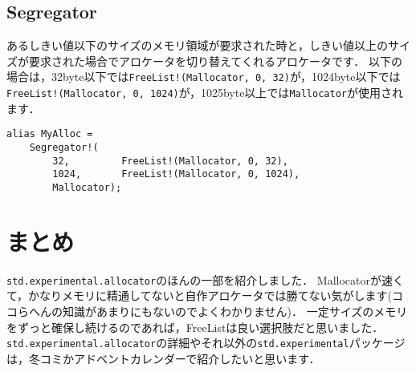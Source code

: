 \subsection{Segregator}

あるしきい値以下のサイズのメモリ領域が要求された時と，しきい値以上のサイズが要求された場合でアロケータを切り替えてくれるアロケータです．
以下の場合は，32byte以下では\texttt{FreeList!(Mallocator,\ 0,\ 32)}が，1024byte以下では\texttt{FreeList!(Mallocator,\ 0,\ 1024)}が，1025byte以上では\texttt{Mallocator}が使用されます．

\begin{lstlisting}
alias MyAlloc =
    Segregator!(
        32,         FreeList!(Mallocator, 0, 32),
        1024,       FreeList!(Mallocator, 0, 1024),
        Mallocator);
\end{lstlisting}


\section{まとめ}

\texttt{std.experimental.allocator}のほんの一部を紹介しました．
Mallocatorが速くて，かなりメモリに精通してないと自作アロケータでは勝てない気がします(ココらへんの知識があまりにもないのでよくわかりません)．
一定サイズのメモリをずっと確保し続けるのであれば，FreeListは良い選択肢だと思いました．
\texttt{std.experimental.allocator}の詳細やそれ以外の\texttt{std.experimental}パッケージは，冬コミかアドベントカレンダーで紹介したいと思います．
